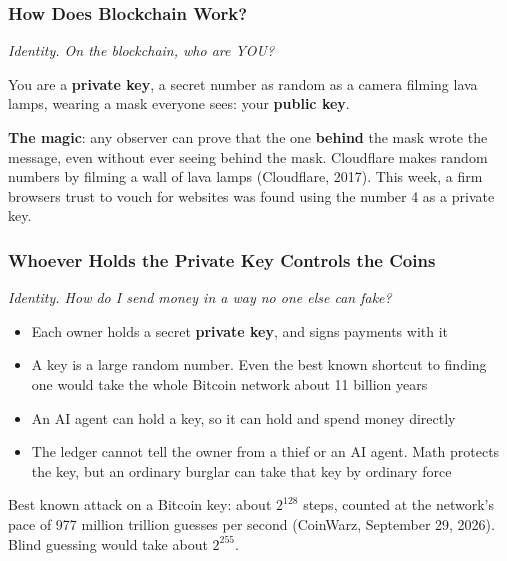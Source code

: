 \documentclass[aspectratio=169]{beamer}
\newcommand{\lead}[1]{{\small\itshape\textcolor{gtnavy!80}{#1}}\par\vspace{1.5mm}}
\newcommand{\bi}{\begin{itemize}}
\newcommand{\ei}{\end{itemize}}
\newcommand{\m}{\item}
\begin{document}
\begin{frame}[label=appx-signature]
\frametitle{How Does Blockchain Work?}
\lead{Identity. On the blockchain, who are YOU?}

\begin{center}
\end{center}
You are a \textbf{private key}, a secret number as random as a camera filming lava lamps, wearing a mask everyone sees: your \textbf{public key}.
\vspace{2mm}

\textbf{\textcolor{gtnavy}{The magic}}: any observer can prove that the one \textbf{behind} the mask wrote the message, even without ever seeing behind the mask.
\vfill
{\scriptsize Cloudflare makes random numbers by filming a wall of lava lamps (Cloudflare, 2017). This week, a firm browsers trust to vouch for websites was found using the number 4 as a private key.}
\par\vspace{0pt plus 1fill}\hfill{\scriptsize \hyperlink{main-metaphor}{}}
\end{frame}


\begin{frame}[label=appx-key]
\frametitle{Whoever Holds the Private Key Controls the Coins}
\lead{Identity. How do I send money in a way no one else can fake?}

\bi
\m Each owner holds a secret \textbf{private key}, and signs payments with it
\m A key is a large random number. Even the best known shortcut to finding one would take the whole Bitcoin network about 11 billion years
\m An AI agent can hold a key, so it can hold and spend money directly
\m The ledger cannot tell the owner from a thief or an AI agent. Math protects the key, but an ordinary burglar can take that key by ordinary force
\ei
\vfill
{\scriptsize Best known attack on a Bitcoin key: about $2^{128}$ steps, counted at the network's pace of 977 million trillion guesses per second (CoinWarz, September 29, 2026). Blind guessing would take about $2^{255}$.}
\par\vspace{0pt plus 1fill}\hfill{\scriptsize \hyperlink{main-metaphor}{}}
\end{frame}
\end{document}
